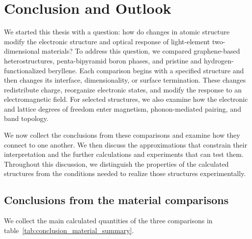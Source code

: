 \chapter{Conclusion and Outlook}
\label{cha:conclusion_outlook}

We started this thesis with a question: how do changes in atomic structure modify the electronic structure and optical response of light-element two-dimensional materials?
To address this question, we compared graphene-based heterostructures, penta-bipyramid boron phases, and pristine and hydrogen-functionalized beryllene.
Each comparison begins with a specified structure and then changes its interface, dimensionality, or surface termination.
These changes redistribute charge, reorganize electronic states, and modify the response to an electromagnetic field.
For selected structures, we also examine how the electronic and lattice degrees of freedom enter magnetism, phonon-mediated pairing, and band topology.

We now collect the conclusions from these comparisons and examine how they connect to one another.
We then discuss the approximations that constrain their interpretation and the further calculations and experiments that can test them.
Throughout this discussion, we distinguish the properties of the calculated structures from the conditions needed to realize those structures experimentally.

\section{Conclusions from the material comparisons}
\label{sec:conclusions_material_comparisons}

We collect the main calculated quantities of the three comparisons in table~\ref{tab:conclusion_material_summary}.

